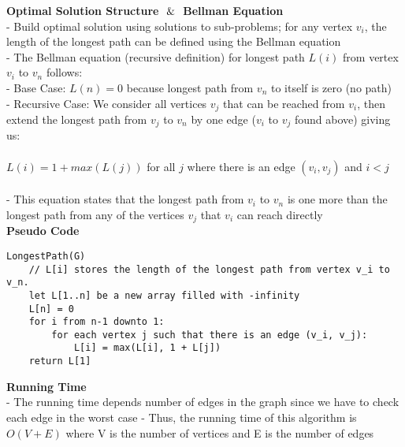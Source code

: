 \documentclass[letterpaper,12pt]{article}
\begin{document}
\begin{enumerate}
\textbf{Optimal Solution Structure $\And$ Bellman Equation} \\
- Build optimal solution using solutions to sub-problems; for any vertex $v_i$, the length of the longest path can be defined using the Bellman equation \\
- The Bellman equation (recursive definition) for longest path $L(i)$ from vertex $v_i$ to $v_n$ follows: \\
- Base Case: $L(n) = 0$ because longest path from $v_n$ to itself is zero (no path) \\
- Recursive Case: We consider all vertices $v_j$ that can be reached from $v_i$, then extend the longest path from $v_j$ to $v_n$ by one edge ($v_i$ to $v_j$ found above)  giving us: \\
\\ $L(i) = 1 + max(L(j))$ for all $j$ where there is an edge $(v_i, v_j)$ and $i < j$ \\ \\
- This equation states that the longest path from $v_i$ to $v_n$ is one more than the longest path from any of the vertices $v_j$ that $v_i$ can reach directly \\

\textbf{Pseudo Code} 
\begin{verbatim}
LongestPath(G)
    // L[i] stores the length of the longest path from vertex v_i to v_n.
    let L[1..n] be a new array filled with -infinity
    L[n] = 0
    for i from n-1 downto 1:
        for each vertex j such that there is an edge (v_i, v_j):
            L[i] = max(L[i], 1 + L[j])
    return L[1]
\end{verbatim}

\textbf{Running Time} \\
- The running time depends number of edges in the graph since we have to check each edge in the worst case
- Thus, the running time of this algorithm is $O(V+E)$ where V is the number of vertices and E is the number of edges\\

\end{enumerate}
\end{document}
